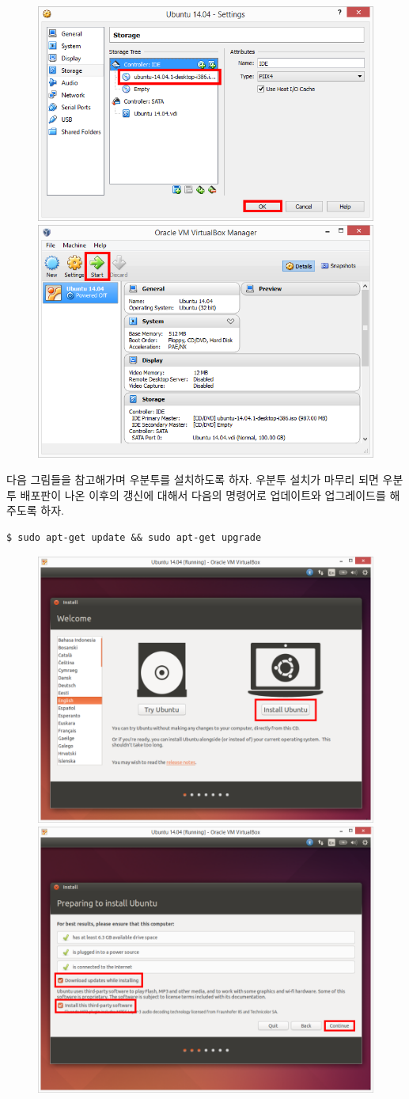 \begin{figure}[h]
\centering
\includegraphics[width=0.49\columnwidth]{pictures/chapter3/vm15.png}
\includegraphics[width=0.49\columnwidth]{pictures/chapter3/vm16.png}
\end{figure}

\newpage

다음 그림들을 참고해가며 우분투를 설치하도록 하자. 우분투 설치가 마무리 되면 우분투 배포판이 나온 이후의 갱신에 대해서 다음의 명령어로 업데이트와 업그레이드를 해주도록 하자.

\begin{lstlisting}[language=ROS]
$ sudo apt-get update && sudo apt-get upgrade
\end{lstlisting}

\begin{figure}[h]
\centering
\includegraphics[width=0.45\columnwidth]{pictures/chapter3/vm17.png}
\includegraphics[width=0.45\columnwidth]{pictures/chapter3/vm18.png}
\end{figure}

